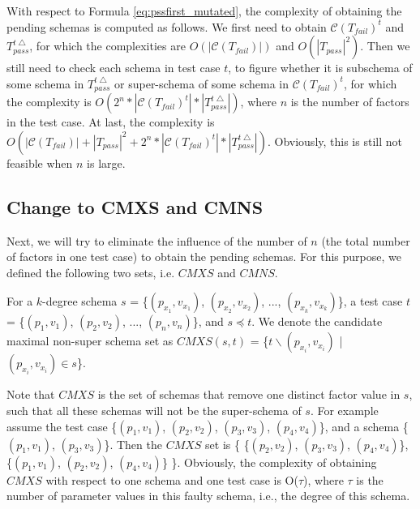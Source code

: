 With respect to Formula \ref{eq:pssfirst_mutated}, the complexity of obtaining the pending schemas is computed as follows. We first need to obtain $\mathcal{C}(T_{fail})^{t}$ and $T_{pass}^{t\bigtriangleup}$, for which the complexities are $O(|\mathcal{C}(T_{fail})|)$ and $O(|T_{pass}|^{2})$. Then we still need to check each schema in test case $t$, to figure whether it is subschema of some schema in $T_{pass}^{t\bigtriangleup}$ or super-schema of some schema in $\mathcal{C}(T_{fail})^{t}$, for which the complexity is $O(2^{n}* |\mathcal{C}(T_{fail})^{t}| * |T_{pass}^{t\bigtriangleup}|)$, where $n$ is the number of factors in the test case.  At last, the complexity is $O(|\mathcal{C}(T_{fail})| + |T_{pass}|^{2} + 2^{n}* |\mathcal{C}(T_{fail})^{t}| * |T_{pass}^{t\bigtriangleup}| )$. Obviously, this is still not feasible when $n$ is large.



\subsection{Change to CMXS and CMNS}

Next, we will try to eliminate the influence of the number of $n$ (the total number of factors in one test case) to obtain the pending schemas. For this purpose, we defined the following two sets, i.e. $CMXS$ and $CMNS$.

\begin{definition}
For a $k$-degree schema $s$ = \{$(p_{x_{1}}, v_{x_{1}})$, $(p_{x_{2}}, v_{x_{2}})$, ..., $(p_{x_{k}}, v_{x_{k}})$\}, a test case $t$ = \{$(p_{1}, v_{1})$, $(p_{2}, v_{2})$, ..., $(p_{n}, v_{n})$\}, and $s \preceq t$. We denote the candidate maximal non-super schema set as $CMXS(s,t)$ = \{$t \backslash (p_{x_{i}}, v_{x_{i}})$ | $(p_{x_{i}}, v_{x_{i}}) \in s $\}.
\end{definition}

Note that $CMXS$ is the set of schemas that remove one distinct factor value in $s$, such that all these schemas will not be the super-schema of $s$. For example assume the test case \{$(p_{1}, v_{1})$, $(p_{2}, v_{2})$, $(p_{3}, v_{3})$, $(p_{4}, v_{4})$\}, and a schema \{$(p_{1}, v_{1})$, $(p_{3}, v_{3})$\}. Then the $CMXS$ set is \{ \{$(p_{2}, v_{2})$,  $(p_{3}, v_{3})$, $(p_{4}, v_{4})$\}, \{$(p_{1}, v_{1})$,  $(p_{2}, v_{2})$, $(p_{4}, v_{4})$\} \}. Obviously, the complexity of obtaining $CMXS$ with respect to one schema and one test case is O($\tau$), where $\tau$ is the number of parameter values in this faulty schema, i.e., the degree of this schema.

